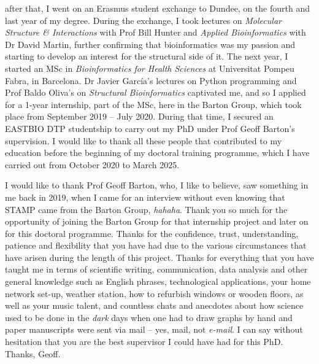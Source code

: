 after that, I went on an Erasmus student exchange to Dundee, on the fourth and last year of my degree. During the exchange, I took lectures on \textit{Molecular Structure \& Interactions} with Prof Bill Hunter and \textit{Applied Bioinformatics} with Dr David Martin, further confirming that bioinformatics was my passion and starting to develop an interest for the structural side of it. The next year, I started an MSc in \textit{Bioinformatics for Health Sciences} at Universitat Pompeu Fabra, in Barcelona. Dr Javier García's lectures on Python programming and Prof Baldo Oliva's on \textit{Structural Bioinformatics} captivated me, and so I applied for a 1-year internship, part of the MSc, here in the Barton Group, which took place from September 2019 -- July 2020. During that time, I secured an EASTBIO DTP studentship to carry out my PhD under Prof Geoff Barton's supervision. I would like to thank all these people that contributed to my education before the beginning of my doctoral training programme, which I have carried out from October 2020 to March 2025.

I would like to thank Prof Geoff Barton, who, I like to believe, saw something in me back in 2019, when I came for an interview without even knowing that STAMP came from the Barton Group, \textit{hahaha}. Thank you so much for the opportunity of joining the Barton Group for that internship project and later on for this doctoral programme. Thanks for the confidence, trust, understanding, patience and flexibility that you have had due to the various circumstances that have arisen during the length of this project. Thanks for everything that you have taught me in terms of scientific writing, communication, data analysis and other general knowledge such as English phrases, technological applications, your home network set-up, weather station, how to refurbish windows or wooden floors, as well as your music talent, and countless chats and anecdotes about how science used to be done in the \textit{dark} days when one had to draw graphs by hand and paper manuscripts were sent via mail -- yes, mail, not \textit{e-mail}. I can say without hesitation that you are the best supervisor I could have had for this PhD. Thanks, Geoff.

